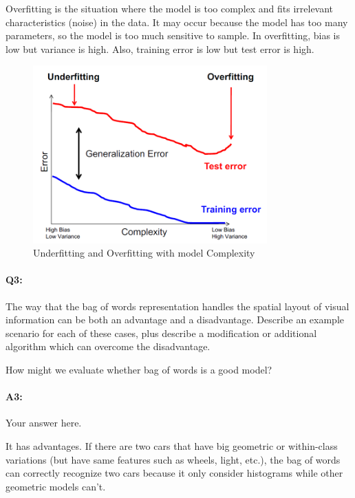 Overfitting is the situation where the model is too complex and fits irrelevant characteristics (noise) in the data. It may occur because the model has too many parameters, so the model is too much sensitive to sample. In overfitting, bias is low but variance is high. Also, training error is low but test error is high. 


\begin{figure}[h]
    \centering
    \includegraphics[width=9cm]{questions/A2.PNG}
    \caption{Underfitting and Overfitting with model Complexity}
    \label{fig1}
\end{figure}


\pagebreak
\paragraph{Q3:} The way that the bag of words representation handles the spatial layout of visual information can be both an advantage and a disadvantage. Describe an example scenario for each of these cases, plus describe a modification or additional algorithm which can overcome the disadvantage. 

How might we evaluate whether bag of words is a good model?

\paragraph{A3:} Your answer here.


It has advantages. If there are two cars that have big geometric or within-class variations (but have same features such as wheels, light, etc.), the bag of words can correctly recognize two cars because it only consider histograms while other geometric models can't. 


